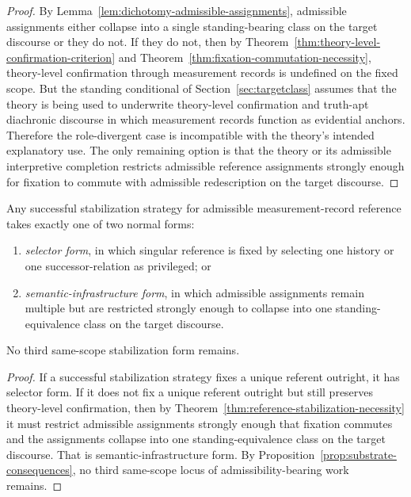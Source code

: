 \begin{proof}
By Lemma~\ref{lem:dichotomy-admissible-assignments}, admissible assignments either collapse into a
single standing-bearing class on the target discourse or they do not. If they do not, then by
Theorem~\ref{thm:theory-level-confirmation-criterion} and
Theorem~\ref{thm:fixation-commutation-necessity}, theory-level confirmation through measurement
records is undefined on the fixed scope. But the standing conditional of
Section~\ref{sec:targetclass} assumes that the theory is being used to underwrite theory-level
confirmation and truth-apt diachronic discourse in which measurement records function as evidential
anchors. Therefore the role-divergent case is incompatible with the theory's intended explanatory use.
The only remaining option is that the theory or its admissible interpretive completion restricts
admissible reference assignments strongly enough for fixation to commute with admissible
redescription on the target discourse.
\end{proof}

\begin{proposition}
\label{prop:selector-normal-form}
Any successful stabilization strategy for admissible measurement-record reference takes exactly one of
two normal forms:
\begin{enumerate}
    \item \emph{selector form}, in which singular reference is fixed by selecting one history or one
    successor-relation as privileged; or
    \item \emph{semantic-infrastructure form}, in which admissible assignments remain multiple but are
    restricted strongly enough to collapse into one standing-equivalence class on the target
    discourse.
\end{enumerate}
No third same-scope stabilization form remains.
\end{proposition}

\begin{proof}
If a successful stabilization strategy fixes a unique referent outright, it has selector form. If it does
not fix a unique referent outright but still preserves theory-level confirmation, then by
Theorem~\ref{thm:reference-stabilization-necessity} it must restrict admissible assignments strongly
enough that fixation commutes and the assignments collapse into one standing-equivalence class on the
target discourse. That is semantic-infrastructure form. By
Proposition~\ref{prop:substrate-consequences}, no third same-scope locus of admissibility-bearing
work remains.
\end{proof}

